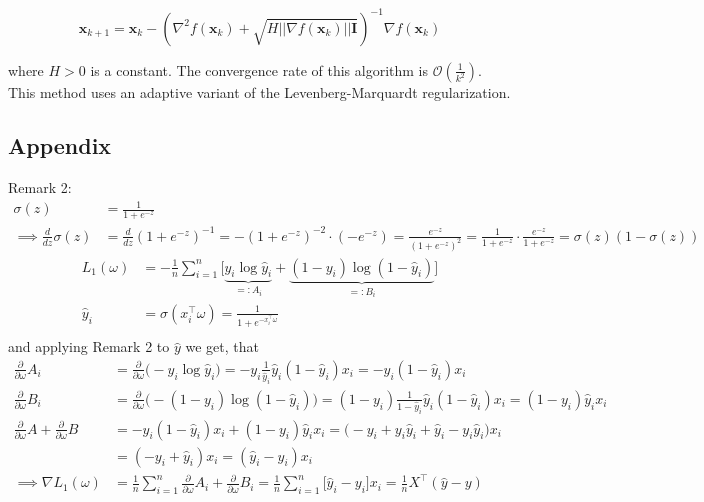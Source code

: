 \documentclass{article}
\begin{document}
\begin{equation}
\mathbf{x}_{k+1} = \mathbf{x}_{k} - ( \nabla^2 f(\mathbf{x}_k) + \sqrt{ H ||\nabla f(\mathbf{x}_k)||\mathbf{I}})^{-1} \nabla f(\mathbf{x}_k)
  \label{eq:regularized-newton}
\end{equation}

where $H > 0$ is a constant. The convergence rate of this algorithm is $\mathcal{O}(\frac{1}{k^2})$. This method uses an adaptive variant of the Levenberg-Marquardt regularization. 

\subsection{Appendix}
Remark 2:
\begin{align*}
  \sigma(z) &= \frac{1}{1 + e^{-z}} \\
  \implies \frac{d}{dz} \sigma(z) &= \frac{d}{dz} (1 + e^{-z})^{-1}
  = -(1 + e^{-z})^{-2} \cdot (-e^{-z}) = \frac{e^{-z}}{(1 + e^{-z})^2}
  = \frac{1}{1 + e^{-z}} \cdot \frac{e^{-z}}{1 + e^{-z}}
  = \sigma(z) (1 - \sigma(z))
\end{align*}
\begin{align*}
L_1(\omega) &= -\frac{1}{n} \sum_{i=1}^n \Big[\underbrace{y_i \log \hat{y}_i}_{=:A_i} + \underbrace{(1 - y_i) \log (1 - \hat{y}_i)}_{=:B_i}\Big] \\
\hat{y}_i &= \sigma(x_i^\top \omega) = \frac{1}{1 + e^{-x_i^\top \omega}} \\
\end{align*}
and applying Remark 2 to $\hat{y}$ we get, that
\begin{align*}
\frac{\partial}{\partial \omega} A_i &= \frac{\partial}{\partial \omega}\big(-y_i \log \hat{y}_i\big) = -y_i \frac{1}{\hat{y}_i} \hat{y}_i (1 - \hat{y}_i) x_i = -y_i (1 - \hat{y}_i) x_i \\
%
\frac{\partial}{\partial \omega} B_i &=\frac{\partial}{\partial \omega} \big(-(1 - y_i) \log (1 - \hat{y}_i)\big) = (1 - y_i) \frac{1}{1 - \hat{y}_i} \hat{y}_i (1 - \hat{y}_i) x_i = (1 - y_i) \hat{y}_i x_i\\
%
\frac{\partial}{\partial \omega} A+\frac{\partial}{\partial \omega} B &= -y_i (1 - \hat{y}_i) x_i + (1 - y_i) \hat{y}_i x_i 
= \big(-y_i + y_i \hat{y}_i + \hat{y}_i - y_i \hat{y}_i \big) x_i\\
&= (-y_i + \hat{y}_i) x_i = (\hat{y}_i-y_i ) x_i\\
%
\implies \nabla L_1(\omega) &= \frac{1}{n} \sum_{i=1}^n \frac{\partial}{\partial \omega} A_i+\frac{\partial}{\partial \omega} B_i
= \frac{1}{n} \sum_{i=1}^n \big[\hat{y}_i - y_i\big] x_i = \frac{1}{n} X^\top (\hat{y} - y)
\end{align*}
\end{document}
